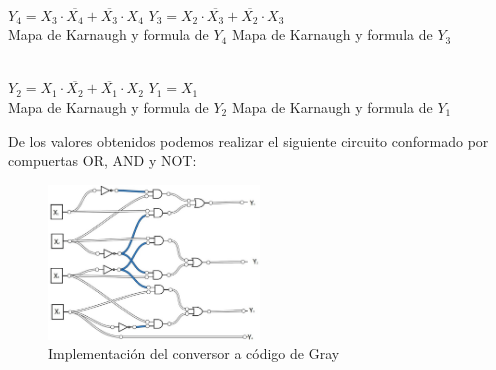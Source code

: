 \begin{center}
	\begin{Karnaugh}
    \end{Karnaugh}
    \begin{Karnaugh}
    \end{Karnaugh}\\
    $Y_4=X_3 \cdot \overline{X_4}+\overline{X_3} \cdot X_4$
    \hspace{28mm}
    $Y_3=X_2 \cdot \overline{X_3}+\overline{X_2} \cdot X_3$\\
    Mapa de Karnaugh y formula de $Y_4$
    \hspace{6mm}
    Mapa de Karnaugh y formula de $Y_3$\\
\end{center}
\medskip
\begin{center}
	\begin{Karnaugh}
    \end{Karnaugh}
    \begin{Karnaugh}
    \end{Karnaugh}\\
    $Y_2=X_1 \cdot \overline{X_2}+\overline{X_1} \cdot X_2$
    \hspace{28mm}
    $Y_1=X_1$\\
    Mapa de Karnaugh y formula de $Y_2$
    \hspace{6mm}
    Mapa de Karnaugh y formula de $Y_1$\\
\end{center}
De los valores obtenidos podemos realizar el siguiente circuito conformado por compuertas OR, AND y NOT:\\
\begin{figure}[H]
	\centering
    \includegraphics[width=0.5\textwidth]{Ejercicio_4/Circuito}
    \caption{Implementación del conversor a código de Gray}
\end{figure}